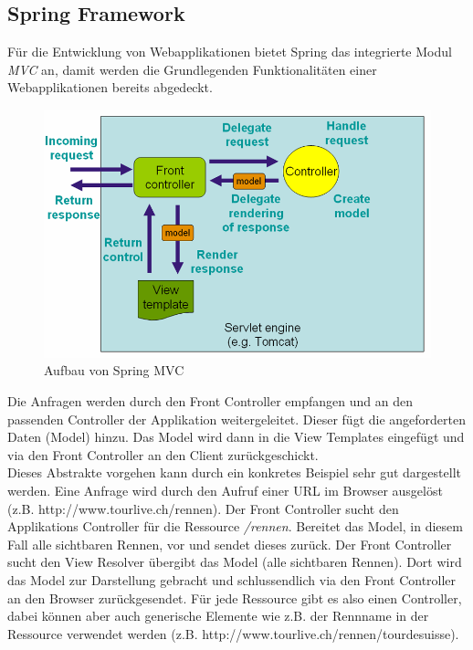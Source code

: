 \subsection{Spring Framework}
Für die Entwicklung von Webapplikationen bietet Spring das integrierte Modul \textit{MVC} an, damit werden die Grundlegenden Funktionalitäten einer Webapplikationen bereits abgedeckt.

\begin{figure}[H]
	\centering
	\includegraphics[width=130mm]{images/tourliveweb/springmvc.png}
	\caption{Aufbau von Spring MVC \cite{springsourcemvc2011}}
	\label{fig:springmvc}
\end{figure}

Die Anfragen werden durch den Front Controller empfangen und an den passenden Controller der Applikation weitergeleitet. Dieser fügt die angeforderten Daten (Model) hinzu. Das Model wird dann in die View Templates eingefügt und via den Front Controller an den Client zurückgeschickt.
\\
Dieses Abstrakte vorgehen kann durch ein konkretes Beispiel sehr gut dargestellt werden. Eine Anfrage wird durch den Aufruf einer URL im Browser ausgelöst (z.B. http://www.tourlive.ch/rennen). Der Front Controller sucht den Applikations Controller für die Ressource \textit{/rennen}. Bereitet das Model, in diesem Fall alle sichtbaren Rennen, vor und sendet dieses zurück. Der Front Controller sucht den View Resolver übergibt das Model (alle sichtbaren Rennen). Dort wird das Model zur Darstellung gebracht und schlussendlich via den Front Controller an den Browser zurückgesendet. Für jede Ressource gibt es also einen Controller, dabei können aber auch generische Elemente wie z.B. der Rennname in der Ressource verwendet werden (z.B. http://www.tourlive.ch/rennen/tourdesuisse).